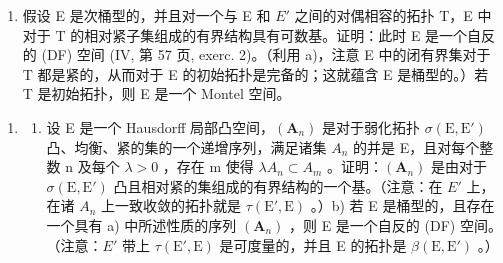 \begin{enumerate}
\def\labelenumi{\alph{enumi})}
\setcounter{enumi}{1}
\tightlist
\item
  假设 E 是次桶型的，并且对一个与 E 和 \(E'\) 之间的对偶相容的拓扑 T，E 中对于 T 的相对紧子集组成的有界结构具有可数基。证明：此时 E 是一个自反的 (DF) 空间 (IV, 第 57 页, exerc. 2)。（利用 a)，注意 E 中的闭有界集对于 T 都是紧的，从而对于 E 的初始拓扑是完备的；这就蕴含 E 是桶型的。）若 T 是初始拓扑，则 E 是一个 Montel 空间。
\end{enumerate}

\begin{enumerate}
\def\labelenumi{\arabic{enumi})}
\setcounter{enumi}{17}
\tightlist
\item
  \begin{enumerate}
  \def\labelenumii{\alph{enumii})}
  \tightlist
  \item
    设 E 是一个 Hausdorff 局部凸空间，\((\mathbf{A}_{n})\) 是对于弱化拓扑 \(\sigma(\mathrm{E}, \mathrm{E}')\) 凸、均衡、紧的集的一个递增序列，满足诸集 \(A_{n}\) 的并是 E，且对每个整数 n 及每个 \(\lambda > 0\) ，存在 m 使得 \(\lambda A_{n} \subset A_{m}\) 。证明：\((\mathbf{A}_{n})\) 是由对于 \(\sigma(\mathrm{E}, \mathrm{E}')\) 凸且相对紧的集组成的有界结构的一个基。（注意：在 \(E'\) 上，在诸 \(A_{n}\) 上一致收敛的拓扑就是 \(\tau(\mathrm{E}', \mathrm{E})\) 。）b) 若 E 是桶型的，且存在一个具有 a) 中所述性质的序列 \((\mathbf{A}_{n})\) ，则 E 是一个自反的 (DF) 空间。（注意：\(E'\) 带上 \(\tau(\mathrm{E}', \mathrm{E})\) 是可度量的，并且 E 的拓扑是 \(\beta(\mathrm{E}, \mathrm{E}')\) 。）
  \end{enumerate}
\end{enumerate}

